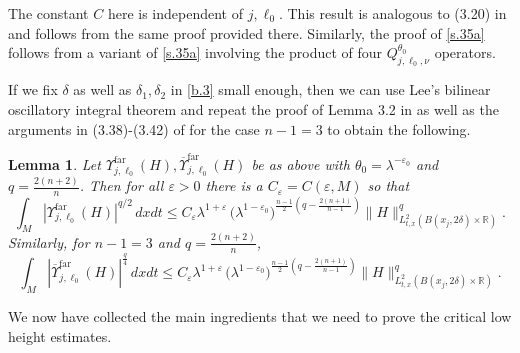 \documentclass[10pt]{amsart}
\newtheorem{lemma}[theorem]{Lemma}
\newcommand{\la}{\lambda}
\newcommand{\e}{\varepsilon}
\newcommand{\1}{{\bf 1}}
\newcommand{\R}{{\mathbb R}}
\newcommand{\far}{\Upsilon^{\text{far}}}
\newcommand{\farbar}{\overline\Upsilon^{\text{far}}}
\begin{document}
The constant $C$ here is independent of $j,\ell_0$. This result is analogous to (3.20) in \cite{HSst} and follows from the same proof provided there. Similarly, the proof of \eqref{s.35a} follows from a variant of \eqref{s.35a} involving the product of four $Q_{j,\ell_0, \nu}^{\theta_0}$ operators.




















If we  fix $\delta$ as well as 
$\delta_1,\delta_2$ in \eqref{b.3} small enough, then we can use Lee's \cite{LeeBilinear} bilinear oscillatory integral theorem 
and repeat the proof of Lemma 3.2 in \cite{blair2023strichartz} as well as the arguments in (3.38)-(3.42) of \cite{HSst} for the case $n-1=3$
to obtain the following.


\begin{lemma}\label{lemmas2}
Let $\far_{j,\ell_0}(H), \farbar_{j,\ell_0}(H)$ be as above with $\theta_0=\la^{-\e_0}$ and $q=\tfrac{2(n+2)}n$.  Then for all $\e>0$ there is a $C_\e=C(\e,M)$ so that 
\begin{equation}\label{s.36}
\int_M |\far_{j,\ell_0}(H)|^{q/2} \, dxdt \le C_\e \la^{1+\e} \, \bigl(\la^{1-\e_0}\bigr)^{\frac{n-1}2(q-\frac{2(n+1)}{n-1})}
\|H\|^q_{L^2_{t,x}(B(x_j,2\delta)\times\R)}.
\end{equation}
Similarly, for $n-1=3$ and $q=\tfrac{2(n+2)}n$,
\begin{equation}\label{s.37}
\int_M |\farbar_{j,\ell_0}(H)|^\frac{q}{4} \, dx dt\le C_\e \la^{1+\e} \, \bigl(\la^{1-\e_0}\bigr)^{\frac{n-1}2(q-\frac{2(n+1)}{n-1})}
\|H\|^q_{L^2_{t,x}(B(x_j,2\delta)\times\R)}.
\end{equation}
\end{lemma}








We now have collected the main ingredients that we need to prove the critical low height estimates.
\end{document}
